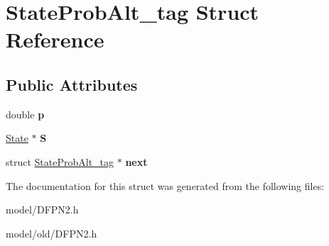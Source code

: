 \hypertarget{structStateProbAlt__tag}{\section{State\-Prob\-Alt\-\_\-tag Struct Reference}
\label{structStateProbAlt__tag}
}
\subsection*{Public Attributes}
\begin{DoxyCompactItemize}
\item 
\hypertarget{structStateProbAlt__tag_a2704ecaab5066c9c05586d3ac8febbcc}{double {\bfseries p}}\label{structStateProbAlt__tag_a2704ecaab5066c9c05586d3ac8febbcc}

\item 
\hypertarget{structStateProbAlt__tag_ad448a49570b70caa77da8676c252694b}{\hyperlink{structState__tag}{State} $\ast$ {\bfseries S}}\label{structStateProbAlt__tag_ad448a49570b70caa77da8676c252694b}

\item 
\hypertarget{structStateProbAlt__tag_afbcff4f2be2857039029328b229ec1ea}{struct \hyperlink{structStateProbAlt__tag}{State\-Prob\-Alt\-\_\-tag} $\ast$ {\bfseries next}}\label{structStateProbAlt__tag_afbcff4f2be2857039029328b229ec1ea}

\end{DoxyCompactItemize}


The documentation for this struct was generated from the following files\-:\begin{DoxyCompactItemize}
\item 
model/D\-F\-P\-N2.\-h\item 
model/old/D\-F\-P\-N2.\-h\end{DoxyCompactItemize}
